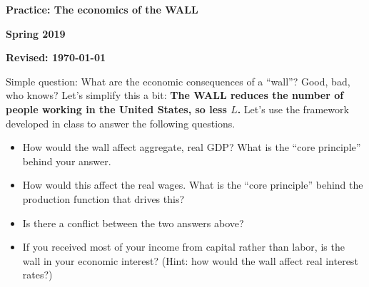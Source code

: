 \documentclass[12pt,pdftex,twoside,letterpaper]{exam}
\begin{document}
\centerline{\Large\bf Practice: The economics of the WALL}
\vspace{1mm}
\centerline{\large\bf Spring 2019}
\vspace{3mm}
\centerline{\bf Revised:  \today}
\bigskip

Simple question: What are the economic consequences of a ``wall''? Good, bad, who knows? Let's simplify this a bit: \textbf{The WALL reduces the number of people working in the United States, so less $L$.} Let's use the framework developed in class to answer the following questions.

\begin{itemize}
\item How would the wall affect aggregate, real GDP? What is the ``core principle'' behind your answer.

\item How would this affect the real wages.  What is the ``core principle'' behind the production function that drives this? 

\item Is there a conflict between the two answers above?

\item If you received most of your income from capital rather than labor, is the wall in your economic interest? (Hint: how would the wall affect real interest rates?)

\end{itemize}
\end{document}
